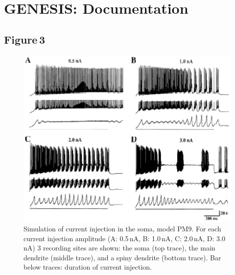 \documentclass[12pt]{article}
\begin{document}
\section*{GENESIS: Documentation}

\subsection*{Figure\,3}

\begin{figure}[h]
\centering
   \includegraphics[scale=0.9]{figures/Fig.1.3.eps}
   \caption{Simulation of current injection in the
soma, model PM9. For each current injection amplitude
(A: 0.5\,nA, B: 1.0\,nA, C: 2.0\,nA, D: 3.0\,
nA) 3 recording sites are shown: the soma (top
trace), the main dendrite (middle trace), and a
spiny dendrite (bottom trace). Bar below traces: duration
of current injection.}
   \label{fig:DS1.3}
\end{figure}



\end{document}
